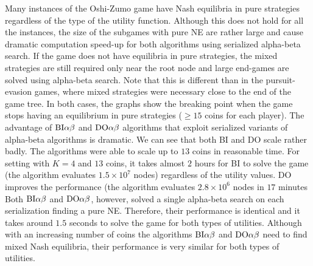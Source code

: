 Many instances of the Oshi-Zumo game have Nash equilibria in pure strategies regardless of the type of the utility function.
Although this does not hold for all the instances, the size of the subgames with pure NE are rather large and cause dramatic computation speed-up for both algorithms using serialized alpha-beta search.
If the game does not have equilibria in pure strategies, the mixed strategies are still required only near the root node and large end-games are solved using alpha-beta search.
Note that this is different than in the pursuit-evasion games, where mixed strategies were necessary close to the end of the game tree.
In both cases, the graphs show the breaking point when the game stops having an equilibrium in pure strategies ($\ge 15$ coins for each player).
The advantage of $\textrm{BI}\alpha\beta$ and $\textrm{DO}\alpha\beta$ algorithms that exploit serialized variants of alpha-beta algorithms is dramatic.
We can see that both \textsc{BI} and \textsc{DO} scale rather badly.
The algorithms were able to scale up to $13$ coins in reasonable time.
For setting with $K=4$ and $13$ coins, it takes almost $2$ hours for \textsc{BI} to solve the game (the algorithm evaluates $1.5\times10^7$ nodes) regardless of the utility values.
\textsc{DO} improves the performance (the algorithm evaluates $2.8\times10^6$ nodes in $17$ minutes 
Both $\textrm{BI}\alpha\beta$ and $\textrm{DO}\alpha\beta$, however, solved a single alpha-beta search on each serialization finding a pure NE.
Therefore, their performance is identical and it takes around $1.5$ seconds to solve the game for both types of utilities.
Although with an increasing number of coins the algorithms $\textrm{BI}\alpha\beta$ and $\textrm{DO}\alpha\beta$ need to find mixed Nash equilibria, their performance is very similar for both types of utilities.

